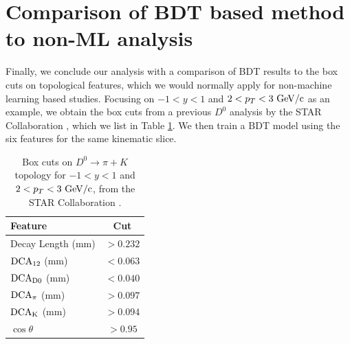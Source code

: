 %
%

\section{Comparison of BDT based method to non-ML analysis}
\label{sec.results_box_cuts}

Finally, we conclude our analysis with a comparison of BDT results to the box cuts on topological features, which we would normally apply for non-machine learning based studies. Focusing on $-1<y<1$ and $2<p_T<3~{\rm GeV/c}$ as an example, we obtain the box cuts from a previous $D^0$ analysis by the STAR Collaboration \cite{STAR}, which we list in Table \ref{tab.box_cuts}. We then train a BDT model using the six features for the same kinematic slice.

\begin{table}[h!]
    \centering
    \begin{tabular}{l|c}
         Feature & Cut \\
         \hline
         Decay Length (mm) & $>0.232$ \\
         ${\rm DCA_{12}}$ (mm) & $<0.063$ \\
         ${\rm DCA_{D0}}$ (mm) & $<0.040$ \\
         ${\rm DCA_{\pi}}$ (mm) & $>0.097$ \\
         ${\rm DCA_{K}}$ (mm) & $>0.094$ \\
         $\cos{\theta}$ & $>0.95$
    \end{tabular}
    \caption{Box cuts on $D^0\rightarrow\pi+K$ topology for $-1<y<1$ and $2<p_T<3~{\rm GeV/c}$, from the STAR Collaboration \cite{STAR}.}
    \label{tab.box_cuts}
\end{table}

